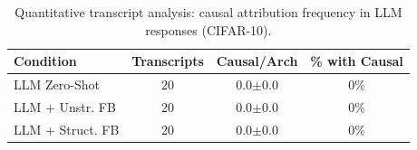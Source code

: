 \begin{table}[t]
\centering\small
\caption{Quantitative transcript analysis: causal attribution frequency in LLM responses (CIFAR-10).}
\label{tab:transcript}
\begin{tabular}{@{}l ccc@{}}
\toprule
Condition & Transcripts & Causal/Arch & \% with Causal \\
\midrule
LLM Zero-Shot & 20 & 0.0$\pm$0.0 & 0\% \\
LLM + Unstr. FB & 20 & 0.0$\pm$0.0 & 0\% \\
LLM + Struct. FB & 20 & 0.0$\pm$0.0 & 0\% \\
\bottomrule
\end{tabular}
\end{table}